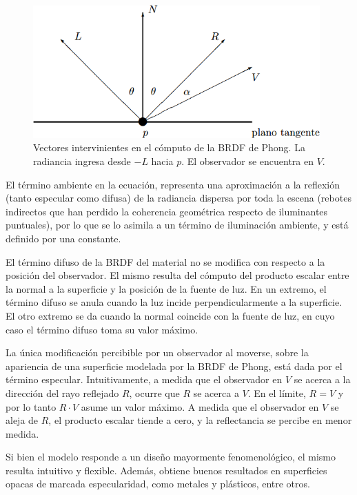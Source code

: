 \begin{figure}
\center
\includegraphics[width=11cm]{figures/phongVecs}
\caption[Vectores intervinientes en el cómputo de la BRDF de Phong]{Vectores intervinientes en el cómputo de la BRDF de Phong. La radiancia ingresa desde $-L$ hacia $p$. El observador se encuentra en $V$.}
\label{fg:phongVecs}
\end{figure}

El término ambiente en la ecuación, representa una aproximación a la reflexión (tanto especular como difusa) de la radiancia dispersa por toda la escena (rebotes indirectos que han perdido la coherencia geométrica respecto de iluminantes puntuales), por lo que se lo asimila a un término de iluminación ambiente, y está definido por una constante.

El término difuso de la BRDF del material no se modifica con respecto a la posición del observador.
El mismo resulta del cómputo del producto escalar entre la normal a la superficie y la posición de la fuente de luz.
En un extremo, el término difuso se anula cuando la luz incide perpendicularmente a la superficie.
El otro extremo se da cuando la normal coincide con la fuente de luz, en cuyo caso el término difuso toma su valor máximo.

La única modificación percibible por un observador al moverse, sobre la apariencia de una superficie modelada por la BRDF de Phong, está dada por el término especular.
Intuitivamente, a medida que el observador en $V$ se acerca a la dirección del rayo reflejado $R$, ocurre que $R$ se acerca a $V$. En el límite, $R = V$
y por lo tanto $R \cdot V$ asume un valor máximo.
A medida que el observador en $V$ se aleja de $R$, el producto escalar tiende a cero, y la reflectancia se percibe en menor medida.

Si bien el modelo responde a un diseño mayormente fenomenológico, el mismo resulta intuitivo y flexible.
Además, obtiene buenos resultados en superficies opacas de marcada especularidad, como metales y plásticos, entre otros.

